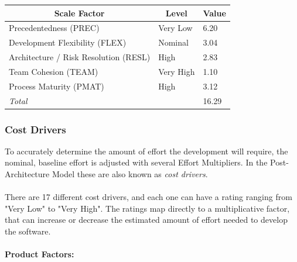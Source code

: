 \documentclass[english]{article}
\begin{document}
\begin{center}
	\begin{tabular}{|p{6cm}|p{2cm}|p{1cm}|}
		\hline
		\multicolumn{1}{|c|}{\textbf{Scale Factor}} & \multicolumn{1}{c|}{\textbf{Level}} & \multicolumn{1}{c|}{\textbf{Value}} \\
		\hline
		Precedentedness (PREC) & Very Low & 6.20 \\
		Development Flexibility (FLEX) & Nominal & 3.04 \\
		Architecture / Risk Resolution (RESL) & High & 2.83 \\
		Team Cohesion (TEAM) & Very High & 1.10 \\
		Process Maturity (PMAT) & High & 3.12 \\
		\hline
		\multicolumn{2}{|l|}{\textit{Total}} & 16.29 \\
		\hline
	\end{tabular}
\end{center}


\subsubsection{Cost Drivers}

To accurately determine the amount of effort the development will require, the nominal, baseline effort is adjusted with several Effort Multipliers. In the Post-Architecture Model these are also known as \textit{cost drivers}. 

\paragraph{}
There are 17 different cost drivers, and each one can have a rating ranging from "Very Low" to "Very High". The ratings map directly to a multiplicative factor, that can increase or decrease the estimated amount of effort needed to develop the software.


\paragraph{Product Factors:}
\end{document}
